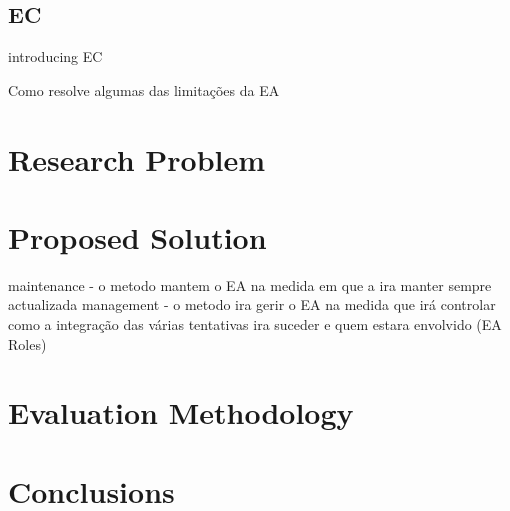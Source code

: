 \documentclass[runningheads]{llncs}
\begin{document}
\subsection{EC}

introducing EC 


Como resolve algumas das limitações da EA


\section{Research Problem} 

\section{Proposed Solution}
maintenance - o metodo mantem o EA na medida em que a ira manter sempre actualizada
management - o metodo ira gerir o EA na medida que irá controlar como a integração das várias tentativas ira suceder e quem estara envolvido (EA Roles)
\section{Evaluation Methodology}


\section{Conclusions}
\end{document}
